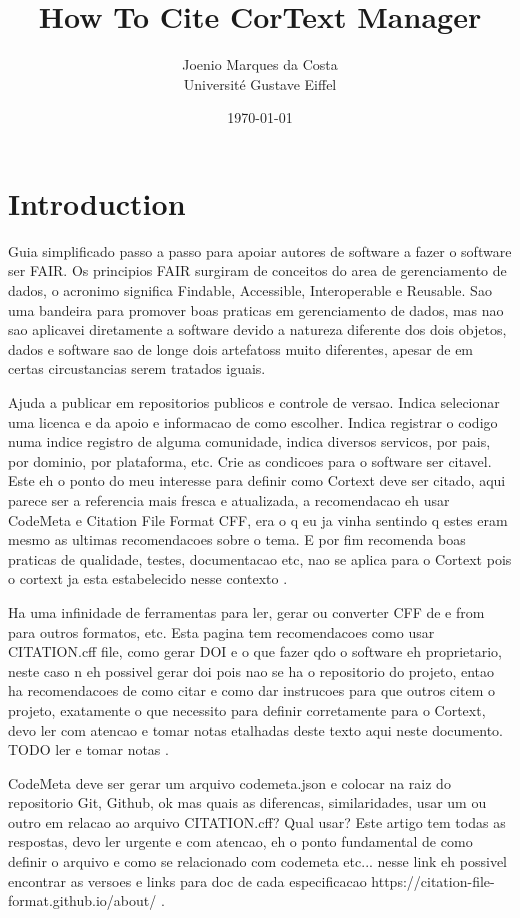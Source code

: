 \documentclass{article}
\title{
  How To Cite CorText Manager
}
\author{
  Joenio Marques da Costa \\
  Université Gustave Eiffel
}
\date{\today}
\begin{document}
\maketitle

\section{Introduction} %

Guia simplificado passo a passo para apoiar autores de software a fazer o software ser FAIR.
Os principios FAIR surgiram de conceitos do area de gerenciamento de dados, o acronimo significa
Findable, Accessible, Interoperable e Reusable.
Sao uma bandeira para promover boas praticas em gerenciamento de dados, mas nao sao aplicavei diretamente a software
devido a natureza diferente dos dois objetos, dados e software sao de longe dois artefatoss muito diferentes, apesar de
em certas circustancias serem tratados iguais.

Ajuda a publicar em repositorios publicos e controle de versao.
Indica selecionar uma licenca e da apoio e informacao de como escolher.
Indica registrar o codigo numa indice registro de alguma comunidade,
indica diversos servicos, por pais, por dominio, por plataforma, etc.
Crie as condicoes para o software ser citavel.
Este eh o ponto do meu interesse para definir como Cortext deve ser citado,
aqui parece ser a referencia mais fresca e atualizada,
a recomendacao eh usar CodeMeta e Citation File Format CFF,
era o q eu ja vinha sentindo q estes eram mesmo as ultimas recomendacoes sobre o tema.
E por fim recomenda boas praticas de qualidade, testes, documentacao etc,
nao se aplica para o Cortext pois o cortext ja esta estabelecido nesse contexto
\cite{noauthor_fair_nodate}.



Ha uma infinidade de ferramentas para ler, gerar ou converter CFF de e from para outros formatos, etc.
Esta pagina tem recomendacoes como usar CITATION.cff file, como gerar DOI e o que fazer qdo o software eh proprietario,
neste caso n eh possivel gerar doi pois nao se ha o repositorio do projeto, entao ha recomendacoes de como
citar e como dar instrucoes para que outros citem o projeto, exatamente o que necessito para definir corretamente
para o Cortext, devo ler com atencao e tomar notas etalhadas deste texto aqui neste documento.
TODO ler e tomar notas
\cite{saragon_standard_2017}.


CodeMeta deve ser gerar um arquivo codemeta.json e colocar na raiz do repositorio Git, Github, ok mas quais as
diferencas, similaridades, usar um ou outro em relacao ao arquivo CITATION.cff? Qual usar?
Este artigo tem todas as respostas, devo ler urgente e com atencao, eh o ponto fundamental de como definir o arquivo e como
se relacionado com codemeta etc...
nesse link eh possivel encontrar as versoes e links para doc de cada especificacao https://citation-file-format.github.io/about/
\cite{druskat_citation_2019}.
\end{document}

